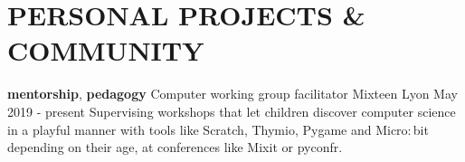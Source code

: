 \documentclass[11pt,a4paper]{moderncv}
\begin{document}



  \vspace{5mm}

  \section{PERSONAL PROJECTS \& COMMUNITY}\label{sec:personal-experience}

    \cventry
    {\textbf{mentorship}, \textbf{pedagogy}}
    {Computer working group facilitator}
    {Mixteen}
    {Lyon}
    {May 2019 - present}{
	  Supervising workshops that let children discover computer science in a
	  playful manner with tools like Scratch, Thymio, Pygame and Micro$:$bit depending on their age,
      at conferences like Mixit or pyconfr.
    }
\end{document}
